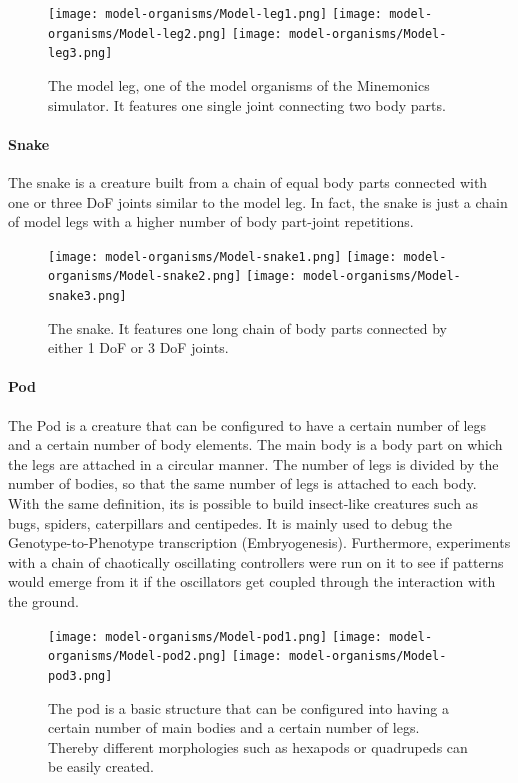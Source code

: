 \documentclass[main]{subfiles}
\begin{document}
\begin{figure}[H]
\centering
\texttt{[image: model-organisms/Model-leg1.png]}
\texttt{[image: model-organisms/Model-leg2.png]}
\texttt{[image: model-organisms/Model-leg3.png]}
\caption[The model leg]{The model leg, one of the model organisms of the Minemonics simulator. It features one single joint connecting two body parts.}
\label{figure:model-leg}
\end{figure}

\paragraph{Snake}

The snake is a creature built from a chain of equal body parts connected with one or three DoF joints similar to the model leg. %
%
In fact, the snake is just a chain of model legs with a higher number of body part-joint repetitions. 

\begin{figure}[H]
\centering
\texttt{[image: model-organisms/Model-snake1.png]}
\texttt{[image: model-organisms/Model-snake2.png]}
\texttt{[image: model-organisms/Model-snake3.png]}
\caption[The snake]{The snake. It features one long chain of body parts connected by either 1 DoF or 3 DoF joints.}
\label{figure:snake}
\end{figure}

\paragraph{Pod}

The Pod is a creature that can be configured to have a certain number of legs and a certain number of body elements. %
%
The main body is a body part on which the legs are attached in a circular manner. %
%
The number of legs is divided by the number of bodies, so that the same number of legs is attached to each body. %
%
With the same definition, its is possible to build insect-like creatures such as bugs, spiders, caterpillars and centipedes. %
%
It is mainly used to debug the Genotype-to-Phenotype transcription (Embryogenesis). %
%
Furthermore, experiments with a chain of chaotically oscillating controllers were run on it to see if patterns would emerge from it if the oscillators get coupled through the interaction with the ground.

\begin{figure}[H]
\centering
\texttt{[image: model-organisms/Model-pod1.png]}
\texttt{[image: model-organisms/Model-pod2.png]}
\texttt{[image: model-organisms/Model-pod3.png]}
\caption[The pod]{The pod is a basic structure that can be configured into having a certain number of main bodies and a certain number of legs. Thereby different morphologies such as hexapods or quadrupeds can be easily created.}
\label{figure:pod}
\end{figure}
\end{document}
